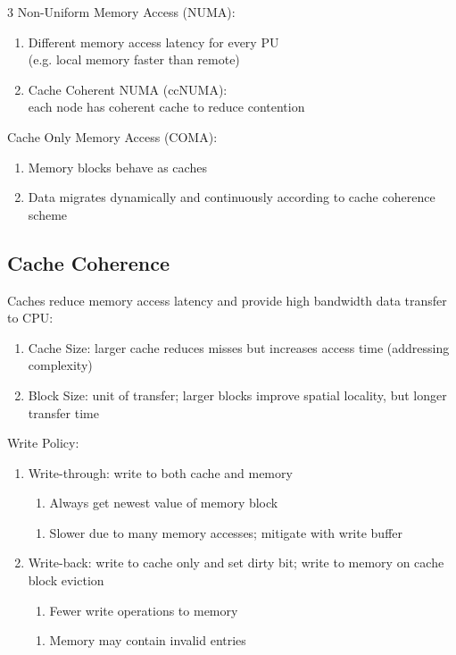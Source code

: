 \documentclass[12pt, a4paper]{article}
\begin{document}
\begin{multicols*}{3}
Non-Uniform Memory Access (NUMA):
\begin{enumerate}[\roman*.]
  \item Different memory access latency for every PU\\(e.g. local memory faster than remote)
  \item Cache Coherent NUMA (ccNUMA):\\each node has coherent cache to reduce contention
\end{enumerate}
{\centering
\par}

Cache Only Memory Access (COMA):
\begin{enumerate}[\roman*.]
  \item Memory blocks behave as caches 
  \item Data migrates dynamically and continuously according to cache coherence scheme
\end{enumerate}
{\centering
\par}
\colbreak
\subsection{Cache Coherence}
Caches reduce memory access latency and provide high bandwidth data transfer to CPU: 
\begin{enumerate}[\roman*.]
  \item Cache Size: larger cache reduces misses but increases access time (addressing complexity) 
  \item Block Size: unit of transfer; larger blocks improve spatial locality, but longer transfer time
\end{enumerate}

Write Policy:
\begin{enumerate}[\roman*.]
  \item Write-through: write to both cache and memory
    \begin{enumerate}[$+$]\vspace{3pt}
      \item Always get newest value of memory block 
    \end{enumerate}
    \begin{enumerate}[$-$]\vspace{6pt}
      \item Slower due to many memory accesses; mitigate with write buffer
    \end{enumerate}
  \item Write-back: write to cache only and set dirty bit; write to memory on cache block eviction
    \begin{enumerate}[$+$]\vspace{3pt}
      \item Fewer write operations to memory
    \end{enumerate}
    \begin{enumerate}[$-$]\vspace{6pt}
      \item Memory may contain invalid entries 
    \end{enumerate}
\end{enumerate}


\end{multicols*}
\end{document}
